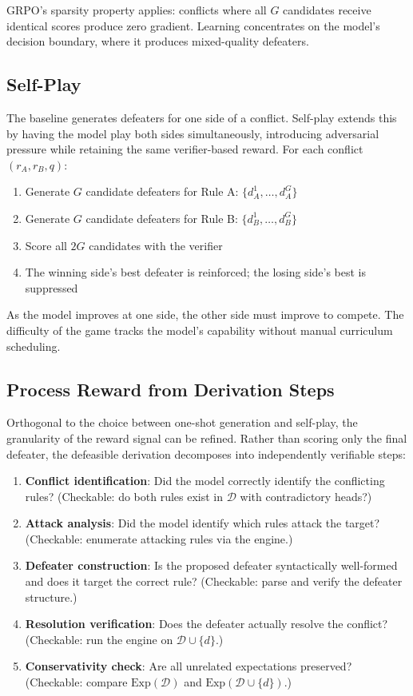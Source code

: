 \documentclass{article}
\newcommand{\D}{\mathcal{D}}
\newcommand{\Exp}{\mathrm{Exp}}
\begin{document}
GRPO's sparsity property applies: conflicts where all $G$ candidates receive identical scores produce zero gradient. Learning concentrates on the model's decision boundary, where it produces mixed-quality defeaters.

\subsection{Self-Play}

The baseline generates defeaters for one side of a conflict. Self-play extends this by having the model play both sides simultaneously, introducing adversarial pressure while retaining the same verifier-based reward. For each conflict $(r_A, r_B, q)$:
\begin{enumerate}[nosep]
    \item Generate $G$ candidate defeaters for Rule A: $\{d_A^1, \ldots, d_A^G\}$
    \item Generate $G$ candidate defeaters for Rule B: $\{d_B^1, \ldots, d_B^G\}$
    \item Score all $2G$ candidates with the verifier
    \item The winning side's best defeater is reinforced; the losing side's best is suppressed
\end{enumerate}

As the model improves at one side, the other side must improve to compete. The difficulty of the game tracks the model's capability without manual curriculum scheduling.

\subsection{Process Reward from Derivation Steps}

Orthogonal to the choice between one-shot generation and self-play, the granularity of the reward signal can be refined. Rather than scoring only the final defeater, the defeasible derivation decomposes into independently verifiable steps:
\begin{enumerate}[nosep]
    \item \textbf{Conflict identification}: Did the model correctly identify the conflicting rules? (Checkable: do both rules exist in $\D$ with contradictory heads?)
    \item \textbf{Attack analysis}: Did the model identify which rules attack the target? (Checkable: enumerate attacking rules via the engine.)
    \item \textbf{Defeater construction}: Is the proposed defeater syntactically well-formed and does it target the correct rule? (Checkable: parse and verify the defeater structure.)
    \item \textbf{Resolution verification}: Does the defeater actually resolve the conflict? (Checkable: run the engine on $\D \cup \{d\}$.)
    \item \textbf{Conservativity check}: Are all unrelated expectations preserved? (Checkable: compare $\Exp(\D)$ and $\Exp(\D \cup \{d\})$.)
\end{enumerate}
\end{document}
